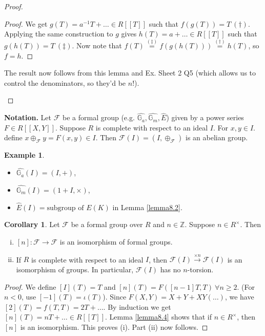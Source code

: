 \documentclass{article}
\theoremstyle{definition}
\newtheorem{cor}[theorem]{Corollary}
\newtheorem{example}{Example}[section]
\begin{document}
\begin{proof}
\begin{enumerate}[(i)]
\begin{proof}
            We get $g(T) = a^{-1}T + \ldots \in R[[T]]$ such that $f(g(T))=T ~ (\dagger)$. Applying the same construction to $g$ gives $h(T) = a  + \ldots \in R[[T]]$ such that $g(h(T))=T ~ (\ddagger)$. Now note that $f(T) \stackrel{(\ddagger)}{=} f(g(h(T))) \stackrel{(\dagger)}{=} h(T)$, so $f=h$.
        \end{proof}
        The result now follows from this lemma and Ex. Sheet 2 Q5 (which allows us to control the denominators, so they'd be $n!$).
    \end{enumerate}
\end{proof} 
\textbf{Notation.} Let $\mathcal{F}$ be a formal group (e.g. $\widehat{\mathbb{G}_a}, \widehat{\mathbb{G}_m}, \widehat{E}$) given by a power series $F \in R [[X,Y]]$. Suppose $R$ is complete with respect to an ideal $I$. For $x, y \in I$. define $x \oplus_{\mathcal{F}} y = F(x,y) \in I$. Then $\mathcal{F}(I) = (I, \oplus_{\mathcal{F}})$ is an abelian group. 
\begin{example}
    \begin{itemize}
        \item $\widehat{\mathbb{G}_a}(I) = (I,+)$,
        \item $\widehat{\mathbb{G}_m}(I) = (1+I, \times)$,
        \item $\widehat{E}(I) = \text{subgroup of }E(K)$ in Lemma \ref{lemma8.2}.
    \end{itemize}
\end{example}
\begin{cor}\label{cor8.5}
    Let $\mathcal{F}$ be a formal group over $R$ and $ n \in \mathbb{Z}$. Suppose $n \in R^\times$. Then 
    \begin{enumerate}[(i)]
        \item $[n] : \mathcal{F} \to \mathcal{F}$ is an isomorphism of formal groups.
        \item If $R$ is complete with respect to an ideal $I$, then $\mathcal{F}(I) \stackrel{\times n}{\to} \mathcal{F}(I)$ is an isomorphism of groups. In particular, $\mathcal{F}(I)$ has no $n$-torsion.
    \end{enumerate}
\end{cor}
\begin{proof}
    We define $[I](T)=T$ and $[n](T) = F([n-1]T,T) ~\forall n\ge 2$. (For $n<0$, use $[-1](T) = \iota(T)$). Since $F(X,Y) = X+Y+XY(\ldots)$, we have $[2](T) = f(T,T) = 2T + \ldots$. By induction we get $[n](T) = nT + \ldots \in R[[T]]$. Lemma \ref{lemma8.4} shows that if $n \in R^\times$, then $[n]$ is an isomorphism. This proves (i). Part (ii) now follows.
\end{proof}
\end{document}

